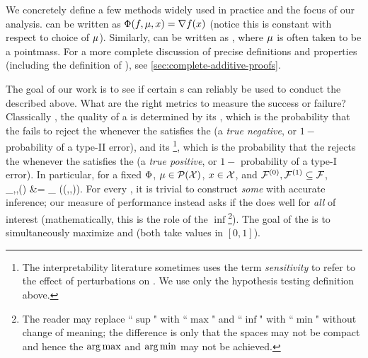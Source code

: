 We concretely define a few methods widely used in practice and the focus of our analysis.
\vanillagrad{} \citep{simonyan13gradient} can be written as $\Phi(f, \mu, x) = \nabla f(x)$ (notice this is constant with respect to choice of $\mu$).
Similarly, \intgradshort{} \citep{sundararajan17integrated} can be written as 
\*[
    \expdef(\model,\covdist,\covval)\feat{j} = \EE_{\covobs\sim\covdist}\Bigg[(\covval\feat{j} - \covobs\feat{j}) \int_0^1 \grad\feat{j}\model(\covobs + \alpha(\covval-\covobs)) \, \dee \alpha \Bigg],
\]
where $\mu$ is often taken to be a pointmass.
%
%
%
%
%
For a more complete discussion of precise definitions and properties (including the definition of \shap{}), see \cref{sec:complete-additive-proofs}.


%
%
%


%

The goal of our work is to see if certain \fielddefname{}s can reliably be used to conduct the \hyptestnames{} described above. What are the right metrics to measure the success or failure?
%
Classically \citep{yerushalmy47hyptest},
the quality of a \hyptestname{} is determined by its \emph{\specname{}}, which is the probability that the \pracname{} fails to reject the \nullname{} whenever the \modelname{} satisfies the \nullname{} (a \emph{true negative}, or $1-$ probability of a type-II error), and its \emph{\sensname{}}\footnote{The interpretability literature sometimes uses the term \emph{sensitivity} to refer to the effect of perturbations on \covname{} \attnames{}  \citep{yeh19infidelity}. We use only the hypothesis testing definition above.}, which is the probability that the \pracname{} rejects the \nullname{} whenever the \modelname{} satisfies the \altname{} (a \emph{true positive}, or $1-$ probability of a type-I error).
%
In particular, for a fixed \fielddefname{} $\Phi$, \basename{} $\mu\in\mathcal{P}(\mathcal{X})$, \obsname{} $x\in\mathcal{X}$, and \bothhypnames{} $\mathcal{F}^{(0)},\mathcal{F}^{(1)} \subseteq \mathcal{F}$, 
\*[
    \specsym_{\expdef,\covdist,\covval}(\oraclehyptest) &= 
    \inf_{\model\in\modelspace\nullind}
    [1-\oraclehyptest(\expdef(\model,\covdist,\covval))] \  \\
    \senssym_{\expdef,\covdist,\covval}(\oraclehyptest) &= 
    \inf_{\model\in\modelspace\altind}
    \oraclehyptest(\expdef(\model,\covdist,\covval)).
\]
%
%
For every \hyptestname{}, it is trivial to construct \emph{some} \modelname{} with accurate inference; our measure of performance instead asks if the \hyptestname{} does well for \emph{all} \modelnames{} of interest (mathematically, this is the role of the $\inf$\footnote{The reader may replace ``$\sup$" with ``$\max$" and ``$\inf$" with ``$\min$" without change of meaning; the difference is only that the spaces may not be compact and hence the $\argmax$ and $\argmin$ may not be achieved.}).
%
%
%
%
%
%
%
%
The goal of the \pracname{} is to simultaneously maximize \specname{} and \sensname{} (both take values in $[0,1]$). 

